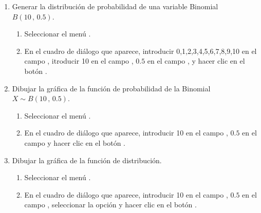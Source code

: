 \begin{enumerate}[leftmargin=*]
\begin{enumerate}
\item Generar la distribución de probabilidad de una variable Binomial $B(10\,,\,0.5)$. 
\begin{indicacion}{
\begin{enumerate}
\item Seleccionar el menú .
\item En el cuadro de diálogo que aparece, introducir 0,1,2,3,4,5,6,7,8,9,10 en el campo ,
itroducir 10 en el campo , $0.5$ en el campo , y hacer clic
en el botón .
\end{enumerate}}
\end{indicacion}

\item Dibujar la gráfica de la función de probabilidad de la Binomial $X\sim B(10\,,\,0.5)$.
\begin{indicacion}{
\begin{enumerate}
\item Seleccionar el menú .
\item En el cuadro de diálogo que aparece, introducir 10 en el campo ,
$0.5$ en el campo  y hacer clic en el botón .
\end{enumerate}}
\end{indicacion}

\item Dibujar la gráfica de la función de distribución.
\begin{indicacion}{
\begin{enumerate}
\item Seleccionar el menú .
\item En el cuadro de diálogo que aparece, introducir 10 en el campo , $0.5$ en el campo
, seleccionar la opción  y hacer clic en el botón
.
\end{enumerate}}
\end{indicacion}


\end{enumerate}
\end{enumerate}
